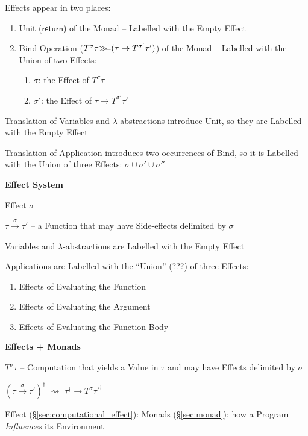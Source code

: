 Effects appear in two places:
\begin{enumerate}
  \item Unit ($\mathsf{return}$) of the Monad -- Labelled with the
    Empty Effect
  \item Bind Operation ($T^\sigma\tau \mathsf{\gg\kern-3pt=} (\tau \rightarrow
    T^{\sigma'}\tau')$) of the Monad -- Labelled with the Union of two
    Effects: %
    \begin{enumerate}
      \item $\sigma$: the Effect of $T^\sigma\tau$
      \item $\sigma'$: the Effect of $\tau \rightarrow
        T^{\sigma'}\tau'$
    \end{enumerate}
\end{enumerate}

Translation of Variables and $\lambda$-abstractions introduce Unit, so
they are Labelled with the Empty Effect

Translation of Application introduces two occurrences of Bind, so it
is Labelled with the Union of three Effects: $\sigma \cup \sigma' \cup
\sigma''$ %


\textbf{Effect System}

Effect $\sigma$

$\tau \xrightarrow{\sigma} \tau'$ -- a Function that may have
Side-effects delimited by $\sigma$

Variables and $\lambda$-abstractions are Labelled with the Empty
Effect

Applications are Labelled with the ``Union'' (???) of three Effects:
\begin{enumerate}
  \item Effects of Evaluating the Function
  \item Effects of Evaluating the Argument
  \item Effects of Evaluating the Function Body
\end{enumerate}


\textbf{Effects + Monads}

$T^\sigma\tau$ -- Computation that yields a Value in $\tau$ and may
have Effects delimited by $\sigma$

$(\tau \xrightarrow{\sigma} \tau')^\dag$
$\rightsquigarrow$
$\tau^\dag \rightarrow T^\sigma \tau'^\dag$


\asterism


Effect (\S\ref{sec:computational_effect}): Monads (\S\ref{sec:monad});
how a Program \emph{Influences} its Environment

